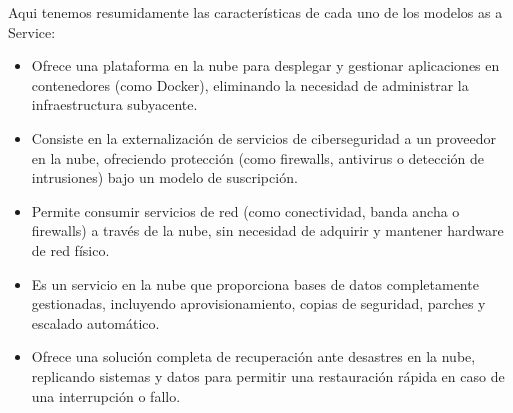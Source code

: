 

\begin{solution}
	Aqui tenemos resumidamente las características de cada uno de los modelos as a Service:
	\begin{itemize}
		\item {} Ofrece una plataforma en la nube para desplegar y gestionar aplicaciones en contenedores (como Docker), eliminando la necesidad de administrar la infraestructura subyacente.

		\item {} Consiste en la externalización de servicios de ciberseguridad a un proveedor en la nube, ofreciendo protección (como firewalls, antivirus o detección de intrusiones) bajo un modelo de suscripción.

		\item {} Permite consumir servicios de red (como conectividad, banda ancha o firewalls) a través de la nube, sin necesidad de adquirir y mantener hardware de red físico.

		\item {} Es un servicio en la nube que proporciona bases de datos completamente gestionadas, incluyendo aprovisionamiento, copias de seguridad, parches y escalado automático.

		\item {} Ofrece una solución completa de recuperación ante desastres en la nube, replicando sistemas y datos para permitir una restauración rápida en caso de una interrupción o fallo.
	\end{itemize}

\end{solution}
